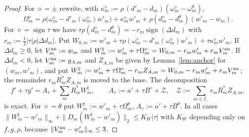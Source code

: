 \documentclass[10pt]{amsart}
\theoremstyle{definition}
\theoremstyle{remark}
\newcommand{\sgn}{\operatorname{sign}}
\begin{document}
\begin{proof}
For $\diamond=\pm$ rewrite, with $\kappa^\diamond_m:=\rho\,(d'_m-d_m)(\omega^\diamond_m
-\omega^\theta_m)$,
\[
 \Omega^\diamond_m=\rho\big(\omega^\diamond_m-d'_m(\omega^\diamond_m)w'_m\big)+
 \kappa^\diamond_mw'_m+\rho(d^\diamond_m-d^\theta_m)(w'_m-w_m).
\]
For $\diamond=\sgn\tau$ we have $\tau\rho(d^\diamond_m-d^\theta_m)=-r_m\sgn
(\Delta d_m)$ with $r_m:=\frac12|\tau|\rho|\Delta d_m|$.  Put
$W_{0,m}:=w'_m+\tau\rho(\omega^\diamond_m-d'_m(\omega^\diamond_m)w'_m)+
\tau\kappa^\diamond_mw'_m$.  If $\Delta d_m\ge0$, let $V^{\rm an}_m:=w_m$ and
$W^\natural_m:=w'_m+\tau\Omega^\diamond_m=W_{0,m}-r_mw'_m+r_mV^{\rm an}_m$.  If
$\Delta d_m<0$, let $V^{\rm an}_m:=y_{A,m}$ and $Z_{A,m}$ be given by
Lemma~\ref{lem:anchor} for $(w_m,w'_m)$, and put $W^\natural_m:=w'_m+\tau
\Omega^\diamond_m-r_mZ_{A,m}=W_{0,m}-r_mw'_m+r_mV^{\rm an}_m$; the remainder
$r_mR^*_mZ_{A,m}$ is moved to the base.  The decomposition
\[
 f'+\tau g'=A_\tau+\sum_mR^*_mW^\natural_m,\qquad A_\tau:=a'+\tau B^\diamond
 +\mathcal Z,\quad\mathcal Z:=\sum_{m\in I_-}r_mR^*_mZ_{A,m},
\]
is exact.  For $\diamond=\theta$ put $W^\natural_m:=w'_m+\tau\Omega^\theta_m$,
$A_\tau:=a'+\tau B^\theta$.  In all cases $\|W^\natural_m-w'_m\|_\infty+
\|D_m(W^\natural_m-w'_m)\|_2\le K_W|\tau|$ with $K_W$ depending only on
$f,g,\rho$, because $\|V^{\rm an}_m-w'_m\|_\infty\le3$.


\end{proof}
\end{document}
